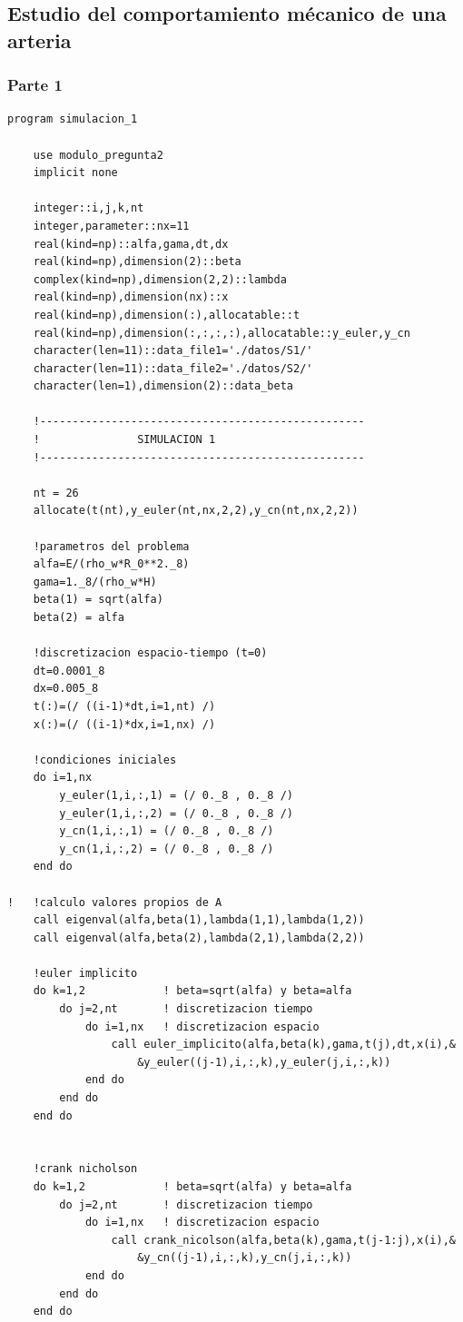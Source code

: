\documentclass[letterpaper]{article}
\begin{document}
\newpage

\subsection{Estudio del comportamiento mécanico de una arteria}

\subsubsection{Parte 1}

\begin{lstlisting}
program simulacion_1

	use modulo_pregunta2
	implicit none
	
	integer::i,j,k,nt
	integer,parameter::nx=11
	real(kind=np)::alfa,gama,dt,dx
	real(kind=np),dimension(2)::beta
	complex(kind=np),dimension(2,2)::lambda
	real(kind=np),dimension(nx)::x
	real(kind=np),dimension(:),allocatable::t
	real(kind=np),dimension(:,:,:,:),allocatable::y_euler,y_cn
	character(len=11)::data_file1='./datos/S1/'
	character(len=11)::data_file2='./datos/S2/'
	character(len=1),dimension(2)::data_beta
	
	!--------------------------------------------------
	!				SIMULACION 1
	!--------------------------------------------------
	
	nt = 26
	allocate(t(nt),y_euler(nt,nx,2,2),y_cn(nt,nx,2,2))
	
	!parametros del problema
	alfa=E/(rho_w*R_0**2._8)
	gama=1._8/(rho_w*H)
	beta(1) = sqrt(alfa)
	beta(2) = alfa	
	
	!discretizacion espacio-tiempo (t=0)
	dt=0.0001_8
	dx=0.005_8
	t(:)=(/ ((i-1)*dt,i=1,nt) /)
	x(:)=(/ ((i-1)*dx,i=1,nx) /)
	
	!condiciones iniciales
	do i=1,nx
		y_euler(1,i,:,1) = (/ 0._8 , 0._8 /)
		y_euler(1,i,:,2) = (/ 0._8 , 0._8 /)
		y_cn(1,i,:,1) = (/ 0._8 , 0._8 /)
		y_cn(1,i,:,2) = (/ 0._8 , 0._8 /)
	end do

!	!calculo valores propios de A
	call eigenval(alfa,beta(1),lambda(1,1),lambda(1,2))
	call eigenval(alfa,beta(2),lambda(2,1),lambda(2,2))

	!euler implicito
	do k=1,2			! beta=sqrt(alfa) y beta=alfa
		do j=2,nt		! discretizacion tiempo
			do i=1,nx	! discretizacion espacio
				call euler_implicito(alfa,beta(k),gama,t(j),dt,x(i),&
					&y_euler((j-1),i,:,k),y_euler(j,i,:,k))
			end do
		end do
	end do
	
	
	!crank nicholson
	do k=1,2			! beta=sqrt(alfa) y beta=alfa
		do j=2,nt		! discretizacion tiempo
			do i=1,nx	! discretizacion espacio
				call crank_nicolson(alfa,beta(k),gama,t(j-1:j),x(i),&
					&y_cn((j-1),i,:,k),y_cn(j,i,:,k))
			end do
		end do
	end do
	

\end{lstlisting}
\end{document}
